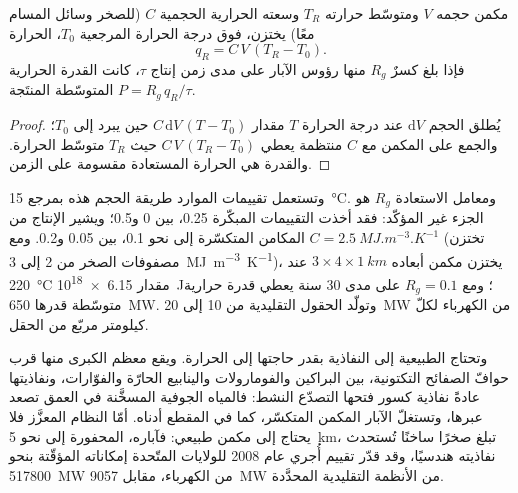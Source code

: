 \begin{proposition}\label{prop:b2:energy-geology:heat}
مكمن حجمه $V$ ومتوسّط حرارته $T_R$ وسعته الحرارية الحجمية $C$ (للصخر وسائل المسام
معًا) يختزن، فوق درجة الحرارة المرجعية $T_0$، الحرارة
\begin{equation}
q_R = C\,V\,(T_R - T_0) .
\label{eq:b2:energy-geology:heat}
\end{equation}
فإذا بلغ كسرٌ $R_g$ منها رؤوس الآبار على مدى زمن إنتاج $\tau$، كانت القدرة الحرارية المتوسّطة
المنتَجة $P = R_g\,q_R/\tau$.
\end{proposition}

\begin{proof}
يُطلق الحجم $\mathrm{d}V$ عند درجة الحرارة $T$ مقدار $C\,\mathrm{d}V\,(T - T_0)$ حين يبرد إلى $T_0$؛
والجمع على المكمن مع $C$ منتظمة يعطي $C\,V\,(T_R - T_0)$ حيث $T_R$ متوسّط
الحرارة. والقدرة هي الحرارة المستعادة مقسومة على الزمن.
\end{proof}

وتستعمل تقييمات الموارد طريقة الحجم هذه بمرجع \qty{15}{\celsius}. ومعامل الاستعادة
$R_g$ هو الجزء غير المؤكّد: فقد أخذت التقييمات المبكّرة 0.25، بين 0 و0.5؛ ويشير الإنتاج من
المكامن المتكسّرة إلى نحو 0.1، بين 0.05 و0.2. ومع $C = \qty{2.5}{MJ.m^{-3}.K^{-1}}$
(تختزن مصفوفات الصخر من 2 إلى \qty{3}{MJ.m^{-3}.K^{-1}})، يختزن مكمن أبعاده $3 \times 4 \times
\qty{1}{km}$ عند \qty{220}{\celsius} مقدار \qty{6.15e18}{J}؛ ومع $R_g = 0.1$ على مدى 30 سنة
يعطي قدرة حرارية متوسّطة قدرها \qty{650}{MW}. وتولّد الحقول التقليدية من 10 إلى
\qty{20}{MW} من الكهرباء لكلّ كيلومتر مربّع من الحقل.

وتحتاج  الطبيعية إلى النفاذية بقدر حاجتها إلى الحرارة. ويقع معظم الكبرى منها قرب
حوافّ الصفائح التكتونية، بين البراكين والفومارولات والينابيع الحارّة والفوّارات، ونفاذيتها
عادةً نفاذية كسور فتحها التصدّع النشط: فالمياه الجوفية المسخَّنة في العمق
تصعد عبرها، وتستغلّ الآبار المكمن المتكسّر، كما في المقطع أدناه. أمّا النظام المعزَّز فلا يحتاج إلى مكمن طبيعي:
فآباره، المحفورة إلى نحو \qty{5}{km}، تبلغ صخرًا ساخنًا تُستحدث نفاذيته هندسيًا، وقد
قدّر تقييم أُجري عام 2008 للولايات المتّحدة إمكاناته المؤقّتة بنحو \qty{517800}{MW} من
الكهرباء، مقابل \qty{9057}{MW} من الأنظمة التقليدية المحدَّدة.

